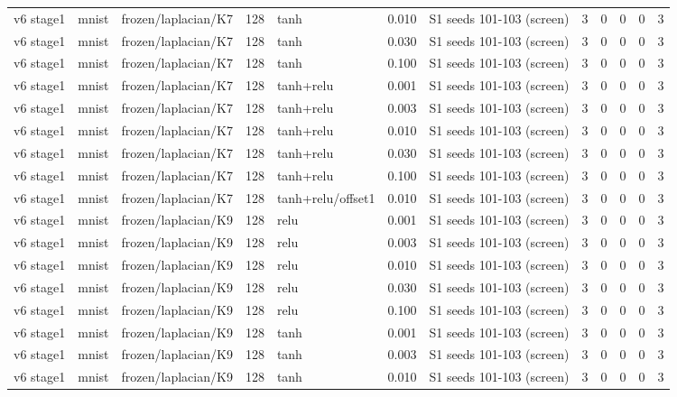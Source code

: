 \begin{table}[htbp]
{\begin{tabular}{@{}lllrlrlrrrrr@{}}
v6 stage1 & mnist & frozen/laplacian/K7 & 128 & tanh & 0.010 & S1 seeds 101-103 (screen) & 3 & 0 & 0 & 0 & 3 \\
v6 stage1 & mnist & frozen/laplacian/K7 & 128 & tanh & 0.030 & S1 seeds 101-103 (screen) & 3 & 0 & 0 & 0 & 3 \\
v6 stage1 & mnist & frozen/laplacian/K7 & 128 & tanh & 0.100 & S1 seeds 101-103 (screen) & 3 & 0 & 0 & 0 & 3 \\
v6 stage1 & mnist & frozen/laplacian/K7 & 128 & tanh+relu & 0.001 & S1 seeds 101-103 (screen) & 3 & 0 & 0 & 0 & 3 \\
v6 stage1 & mnist & frozen/laplacian/K7 & 128 & tanh+relu & 0.003 & S1 seeds 101-103 (screen) & 3 & 0 & 0 & 0 & 3 \\
v6 stage1 & mnist & frozen/laplacian/K7 & 128 & tanh+relu & 0.010 & S1 seeds 101-103 (screen) & 3 & 0 & 0 & 0 & 3 \\
v6 stage1 & mnist & frozen/laplacian/K7 & 128 & tanh+relu & 0.030 & S1 seeds 101-103 (screen) & 3 & 0 & 0 & 0 & 3 \\
v6 stage1 & mnist & frozen/laplacian/K7 & 128 & tanh+relu & 0.100 & S1 seeds 101-103 (screen) & 3 & 0 & 0 & 0 & 3 \\
v6 stage1 & mnist & frozen/laplacian/K7 & 128 & tanh+relu/offset1 & 0.010 & S1 seeds 101-103 (screen) & 3 & 0 & 0 & 0 & 3 \\
v6 stage1 & mnist & frozen/laplacian/K9 & 128 & relu & 0.001 & S1 seeds 101-103 (screen) & 3 & 0 & 0 & 0 & 3 \\
v6 stage1 & mnist & frozen/laplacian/K9 & 128 & relu & 0.003 & S1 seeds 101-103 (screen) & 3 & 0 & 0 & 0 & 3 \\
v6 stage1 & mnist & frozen/laplacian/K9 & 128 & relu & 0.010 & S1 seeds 101-103 (screen) & 3 & 0 & 0 & 0 & 3 \\
v6 stage1 & mnist & frozen/laplacian/K9 & 128 & relu & 0.030 & S1 seeds 101-103 (screen) & 3 & 0 & 0 & 0 & 3 \\
v6 stage1 & mnist & frozen/laplacian/K9 & 128 & relu & 0.100 & S1 seeds 101-103 (screen) & 3 & 0 & 0 & 0 & 3 \\
v6 stage1 & mnist & frozen/laplacian/K9 & 128 & tanh & 0.001 & S1 seeds 101-103 (screen) & 3 & 0 & 0 & 0 & 3 \\
v6 stage1 & mnist & frozen/laplacian/K9 & 128 & tanh & 0.003 & S1 seeds 101-103 (screen) & 3 & 0 & 0 & 0 & 3 \\
v6 stage1 & mnist & frozen/laplacian/K9 & 128 & tanh & 0.010 & S1 seeds 101-103 (screen) & 3 & 0 & 0 & 0 & 3 \\

\end{tabular}}
\end{table}
